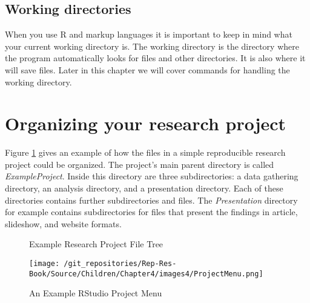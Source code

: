 \subsection{Working directories}

When you use R and markup languages it is important to keep in mind what your current working directory is. The working directory is the directory where the program automatically looks for files and other directories. It is also where it will save files. Later in this chapter we will cover commands for handling the working directory.

\section{Organizing your research project}

Figure \ref{ExampleTree} gives an example of how the files in a simple reproducible research project could be organized. The project's main parent directory is called {\emph{ExampleProject}}. Inside this directory are three subdirectories: a data gathering directory, an analysis directory, and a presentation directory. Each of these directories contains further subdirectories and files. The {\emph{Presentation}} directory for example contains subdirectories for files that present the findings in article, slideshow, and website formats.

\clearpage
\thispagestyle{plain}
\begin{landscape}
\begin{figure}[th!]
    \caption{Example Research Project File Tree}
    \label{ExampleTree}
    \begin{center}
    
    
    \end{center}
\end{figure}
\end{landscape}

\begin{wrapfigure}{r}{0.4\textwidth}
    \caption{An Example RStudio Project Menu}
    \label{ProjectMenu}
    \begin{center}
    \texttt{[image: /git\_repositories/Rep-Res-Book/Source/Children/Chapter4/images4/ProjectMenu.png]}
    \end{center}
\end{wrapfigure}


